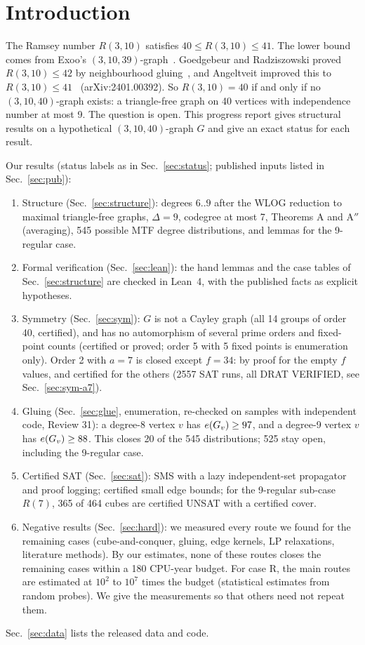 \section{Introduction}\label{sec:intro}
The Ramsey number $R(3,10)$ satisfies $40 \le R(3,10) \le 41$. The lower bound comes from Exoo's $(3,10,39)$-graph~\cite{Ex89}.
Goedgebeur and Radziszowski proved $R(3,10) \le 42$ by neighbourhood gluing~\cite{GR}, and Angeltveit improved this to
$R(3,10) \le 41$~\cite{Ang} (arXiv:2401.00392). So $R(3,10) = 40$ if and only if no $(3,10,40)$-graph exists: a triangle-free
graph on 40 vertices with independence number at most 9. The question is open. This progress report gives
structural results on a hypothetical $(3,10,40)$-graph $G$ and give an exact status for each result.

Our results (status labels as in Sec.~\ref{sec:status}; published inputs listed in Sec.~\ref{sec:pub}):
\begin{enumerate}
\item Structure (Sec.~\ref{sec:structure}): degrees $6..9$ after the WLOG reduction to maximal triangle-free graphs, $\Delta = 9$, codegree
   at most 7, Theorems A and A$''$ (averaging), 545 possible MTF degree distributions, and lemmas for the 9-regular case.
\item Formal verification (Sec.~\ref{sec:lean}): the hand lemmas and the case tables of Sec.~\ref{sec:structure} are checked in Lean~4, with the
   published facts as explicit hypotheses.
\item Symmetry (Sec.~\ref{sec:sym}): $G$ is not a Cayley graph (all 14 groups of order 40, certified), and has no automorphism of
   several prime orders and fixed-point counts (certified or proved; order 5 with 5 fixed points is enumeration
   only). Order 2 with $a = 7$ is closed except $f = 34$: by proof for the empty $f$ values, and certified for the
   others (2557 SAT runs, all DRAT VERIFIED, see Sec.~\ref{sec:sym-a7}).
\item Gluing (Sec.~\ref{sec:glue}, enumeration, re-checked on samples with independent code, Review 31): a degree-8 vertex $v$ has $e(G_{v}) \ge 97$, and a degree-9
   vertex $v$ has $e(G_{v}) \ge 88$. This closes 20 of the 545 distributions; 525 stay open, including the 9-regular case.
\item Certified SAT (Sec.~\ref{sec:sat}): SMS with a lazy independent-set propagator and proof logging; certified small edge
   bounds; for the 9-regular sub-case $R(7)$, 365 of 464 cubes are certified UNSAT with a certified cover.
\item Negative results (Sec.~\ref{sec:hard}): we measured every route we found for the remaining cases (cube-and-conquer, gluing,
   edge kernels, LP relaxations, literature methods). By our estimates, none of these routes closes the remaining
   cases within a 180 CPU-year budget. For case R, the main routes are estimated at $10^{2}$ to $10^{7}$ times the budget
   (statistical estimates from random probes). We give the measurements so that others need not repeat them.
\end{enumerate}
Sec.~\ref{sec:data} lists the released data and code.
